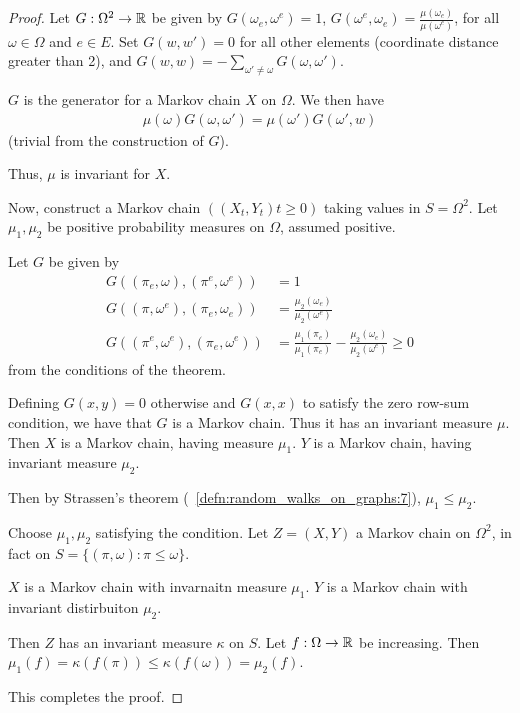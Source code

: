 \begin{proof}
  Let $G: \Omega^{2} \rightarrow \mathbb{R}$ be given by $G(\omega_{e},
  \omega^{e}) = 1$, $G(\omega^{e}, \omega_{e}) =
  \frac{\mu(\omega_{e})}{\mu(\omega^{e})}$, for all $\omega \in
  \Omega$ and $e \in E$.  Set $G(w, w') = 0$ for all other elements
  (coordinate distance greater than 2), and $G(w, w) = - \sum_{\omega'
    \neq \omega} G(\omega, \omega')$.

  $G$ is the generator for a Markov chain $X$ on $\Omega$.
  We then have
  \begin{align}
    \label{eq:8}
    \mu(\omega) G(\omega, \omega') = \mu(\omega') G(\omega', w)
  \end{align} (trivial from the construction of $G$).

  Thus, $\mu$ is invariant for $X$.

  Now, construct a Markov chain $((X_{t}, Y_{t}) t \geq 0)$ taking
  values in $S = \Omega^{2}$.  Let $\mu_{1}, \mu_{2}$ be positive
  probability measures on $\Omega$, assumed positive.

  Let $G$ be given by
  \begin{align}
    \label{eq:9}
    G((\pi_{e}, \omega), (\pi^{e}, \omega^{e})) &= 1 \\
    G((\pi, \omega^{e}), (\pi_{e}, \omega_{e}))
    &= \frac{\mu_{2}(\omega_{e})}{\mu_{2}(\omega^{e})} \\
    G((\pi^{e}, \omega^{e}), (\pi_{e}, \omega^{e}))
    &= \frac{\mu_{1}(\pi_{e})}{\mu_{1}(\pi_{e})} -
    \frac{\mu_{2}(\omega_{e})}{\mu_{2}(\omega^{e})} \geq 0
  \end{align} from the conditions of the theorem.

  Defining $G(x, y) = 0$ otherwise and $G(x, x)$ to satisfy the zero
  row-sum condition, we have that $G$ is a Markov chain.  Thus it has
  an invariant measure $\mu$.  Then $X$ is a Markov chain, having
  measure $\mu_{1}$.  $Y$ is a Markov chain, having invariant measure
  $\mu_{2}$.

  Then by Strassen's theorem (~\ref{defn:random_walks_on_graphs:7}),
  $\mu_{1} \leq \mu_{2}$.

  Choose $\mu_{1}, \mu_{2}$ satisfying the condition.  Let $Z = (X,
  Y)$ a Markov chain on $\Omega^{2}$, in fact on $S = \{ (\pi,
  \omega): \pi \leq \omega \}$.

  $X$ is a Markov chain with invarnaitn measure $\mu_{1}$.  $Y$ is a
  Markov chain with invariant distirbuiton $\mu_{2}$.
  
  Then $Z$ has an invariant measure $\kappa$ on $S$.  Let $f: \Omega
  \rightarrow \mathbb{R}$ be increasing.  Then $\mu_{1}(f) = \kappa(f(\pi))
  \leq \kappa(f(\omega)) = \mu_{2}(f)$.

  This completes the proof.
\end{proof}

